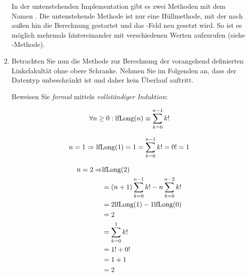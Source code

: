 \documentclass{lehramt-informatik-aufgabe}
\begin{document}
\begin{enumerate}
\begin{liAntwort}
In der untenstehenden Implementation gibt es zwei Methoden mit dem Namen
. Die untenstehende Methode ist nur eine Hüllmethode, mit
der nach außen hin die Berechnung gestartet und das
-Feld neu gesetzt wird. So ist es möglich
 mehrmals hintereinander mit verschiedenen Werten
aufzurufen (siehe -Methode).

\end{liAntwort}


\item Betrachten Sie nun die Methode  zur
Berechnung der vorangehend definierten Linksfakultät ohne obere
Schranke. Nehmen Sie im Folgenden an, dass der Datentyp
 unbeschränkt ist und daher kein Überlauf auftritt.


Beweisen Sie \emph{formal} mittels \emph{vollständiger Induktion}:

\begin{displaymath}
\forall n \geq 0: \text{lfLong}(n) \equiv \sum^{n-1}_{k=0}k!
\end{displaymath}

\begin{liAntwort}

%

\liInduktionAnfang

\begin{displaymath}
n=1 \Rightarrow
\text{lfLong}(1) =
1 =
\sum^{n-1}_{k=0}k! =
0! =
1
\end{displaymath}

\begin{equation*}
\begin{split}
n=2 \Rightarrow & \text{lfLong}(2)\\
& = (n+1) \sum^{n-1}_{k=0}k! - n \sum^{n-2}_{k=0}k! \\
& = 2 \text{lfLong}(1) - 1 \text{lfLong}(0) \\
& = 2 \\
& = \sum^{1}_{k=0}k! \\
& = 1! + 0! \\
& = 1 + 1 \\
& = 2
\end{split}
\end{equation*}

%

\liInduktionVoraussetzung


\end{liAntwort}
\end{enumerate}
\end{document}
